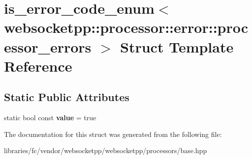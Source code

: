 \hypertarget{structis__error__code__enum_3_01websocketpp_1_1processor_1_1error_1_1processor__errors_01_4}{}\section{is\+\_\+error\+\_\+code\+\_\+enum$<$ websocketpp\+:\+:processor\+:\+:error\+:\+:processor\+\_\+errors $>$ Struct Template Reference}
\label{structis__error__code__enum_3_01websocketpp_1_1processor_1_1error_1_1processor__errors_01_4}
\subsection*{Static Public Attributes}
\begin{DoxyCompactItemize}
\item 
\mbox{\label{structis__error__code__enum_3_01websocketpp_1_1processor_1_1error_1_1processor__errors_01_4_a981549f083d0fb7c2c7afa8184e59056}} 
static bool const {\bfseries value} = true
\end{DoxyCompactItemize}


The documentation for this struct was generated from the following file\+:\begin{DoxyCompactItemize}
\item 
libraries/fc/vendor/websocketpp/websocketpp/processors/base.\+hpp\end{DoxyCompactItemize}
